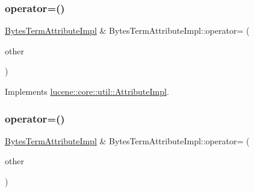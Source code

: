 \subsubsection{\texorpdfstring{operator=()}{operator=()}\hspace{0.1cm}{\footnotesize\ttfamily [1/2]}}
{\footnotesize\ttfamily \mbox{\hyperlink{classlucene_1_1core_1_1analysis_1_1tokenattributes_1_1BytesTermAttributeImpl}{Bytes\+Term\+Attribute\+Impl}} \& Bytes\+Term\+Attribute\+Impl\+::operator= (\begin{DoxyParamCaption}\item[{const \mbox{\hyperlink{classlucene_1_1core_1_1util_1_1AttributeImpl}{lucene\+::core\+::util\+::\+Attribute\+Impl}} \&}]{other }\end{DoxyParamCaption})\hspace{0.3cm}{\ttfamily [virtual]}}



Implements \mbox{\hyperlink{classlucene_1_1core_1_1util_1_1AttributeImpl_ab032e399d03ce2f58c76881cf2b92325}{lucene\+::core\+::util\+::\+Attribute\+Impl}}.

\mbox{\label{classlucene_1_1core_1_1analysis_1_1tokenattributes_1_1BytesTermAttributeImpl_a3d91c14505c1b59ea0372697b87c79f6}} 
\subsubsection{\texorpdfstring{operator=()}{operator=()}\hspace{0.1cm}{\footnotesize\ttfamily [2/2]}}
{\footnotesize\ttfamily \mbox{\hyperlink{classlucene_1_1core_1_1analysis_1_1tokenattributes_1_1BytesTermAttributeImpl}{Bytes\+Term\+Attribute\+Impl}} \& Bytes\+Term\+Attribute\+Impl\+::operator= (\begin{DoxyParamCaption}\item[{const \mbox{\hyperlink{classlucene_1_1core_1_1analysis_1_1tokenattributes_1_1BytesTermAttributeImpl}{Bytes\+Term\+Attribute\+Impl}} \&}]{other }\end{DoxyParamCaption})}

